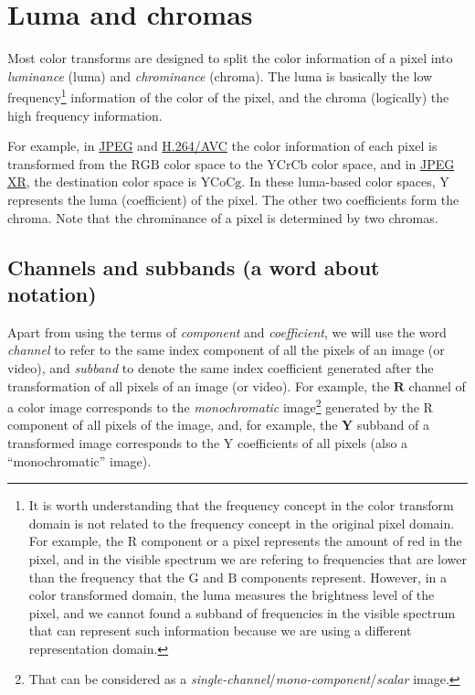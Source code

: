 \section{Luma and chromas}

Most color transforms are designed to split the color information of a
pixel into \emph{luminance} (luma) and \emph{chrominance}
(chroma). The luma is basically the low frequency\footnote{It is worth
  understanding that the frequency concept in the color transform
  domain is not related to the frequency concept in the original pixel
  domain. For example, the $\text{R}$ component or a pixel represents
  the amount of red in the pixel, and in the visible spectrum we are
  refering to frequencies that are lower than the frequency that the
  $\text{G}$ and $\text{B}$ components represent. However, in a color
  transformed domain, the luma measures the brightness level of the
  pixel, and we cannot found a subband of frequencies in the visible
  spectrum that can represent such information because we are using a
  different representation domain.} information of the color of the
pixel, and the chroma (logically) the high frequency information.

For example, in
\href{https://en.wikipedia.org/wiki/JPEG#JPEG_codec_example}{JPEG} and
\href{https://en.wikipedia.org/wiki/Advanced_Video_Coding#Fidelity_range_extensions_and_professional_profiles}{H.264/AVC}
the color information of each pixel is transformed from the
$\text{RGB}$ color space to the $\text{YCrCb}$ color space, and in
\href{https://en.wikipedia.org/wiki/JPEG_XR#Description}{JPEG XR}, the
destination color space is $\text{YCoCg}$. In these luma-based color
spaces, $\text{Y}$ represents the luma (coefficient) of the pixel. The
other two coefficients form the chroma. Note that the chrominance of a
pixel is determined by two chromas.

\subsection*{Channels and subbands (a word about notation)}

Apart from using the terms of \emph{component} and \emph{coefficient},
we will use the word \emph{channel} to refer to the same index
component of all the pixels of an image (or video), and \emph{subband}
to denote the same index coefficient generated after the
transformation of all pixels of an image (or video). For example, the
$\mathbf{R}$ channel of a color image corresponds to the
\emph{monochromatic} image\footnote{That can be considered as a
  \emph{single-channel}/\emph{mono-component}/\emph{scalar} image.}
generated by the $\text{R}$ component of all pixels of the image, and,
for example, the $\mathbf{Y}$ subband of a transformed image
corresponds to the $\text{Y}$ coefficients of all pixels (also a
``monochromatic'' image).

